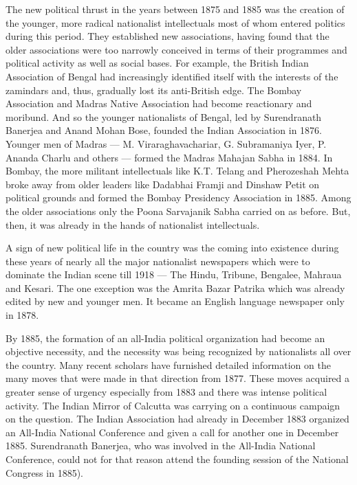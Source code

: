 The new political thrust in the years between 1875 and 1885 was the creation of the younger, more radical nationalist intellectuals most of whom entered politics during this period. They established new associations, having found that the older associations were too narrowly conceived in terms of their programmes and political activity as well as social bases. For example, the British Indian Association of Bengal had increasingly identified itself with the interests of the zamindars and, thus, gradually lost its anti-British edge. The Bombay Association and Madras Native Association had become reactionary and moribund. And so the younger nationalists of Bengal, led by Surendranath Banerjea and Anand Mohan Bose, founded the Indian Association in 1876. Younger men of Madras — M. Viraraghavachariar, G. Subramaniya Iyer, P. Ananda Charlu and others — formed the Madras Mahajan Sabha in 1884. In Bombay, the more militant intellectuals like K.T. Telang and Pherozeshah Mehta broke away from older leaders like Dadabhai Framji and Dinshaw Petit on political grounds and formed the Bombay Presidency Association in 1885. Among the older associations only the Poona Sarvajanik Sabha carried on as before. But, then, it was already in the hands of nationalist intellectuals.

A sign of new political life in the country was the coming into existence during these years of nearly all the major nationalist newspapers which were to dominate the Indian scene till 1918 — The Hindu, Tribune, Bengalee, Mahraua and Kesari. The one exception was the Amrita Bazar Patrika which was already edited by new and younger men. It became an English language newspaper only in 1878.

By 1885, the formation of an all-India political organization had become an objective necessity, and the necessity was being recognized by nationalists all over the country. Many recent scholars have furnished detailed information on the many moves that were made in that direction from 1877. These moves acquired a greater sense of urgency especially from 1883 and there was intense political activity. The Indian Mirror of Calcutta was carrying on a continuous campaign on the question. The Indian Association had already in December 1883 organized an All-India National Conference and given a call for another one in December 1885. Surendranath Banerjea, who was involved in the All-India National Conference, could not for that reason attend the founding session of the National Congress in 1885).

